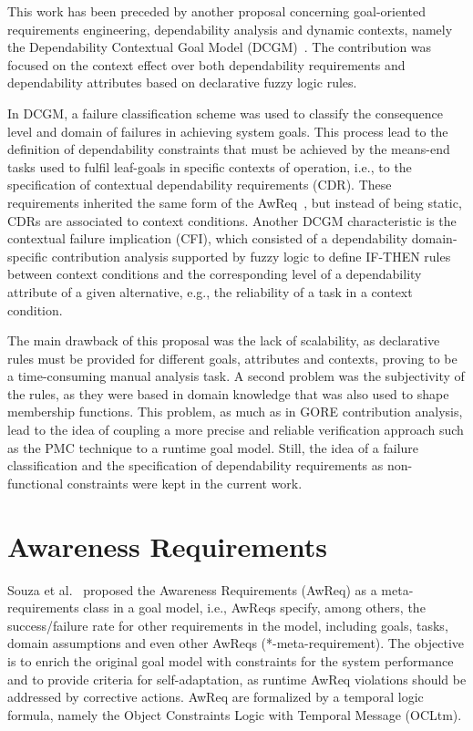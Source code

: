 This work has been preceded by another proposal concerning goal-oriented requirements engineering, dependability analysis and dynamic contexts, namely the Dependability Contextual Goal Model (DCGM)~\cite{Mendonca:2014}. The contribution was focused on the context effect over both dependability requirements and dependability attributes based on declarative fuzzy logic rules. 

In DCGM, a failure classification scheme was used to classify the consequence level and domain of failures in achieving system goals. This process lead to the definition of dependability constraints that must be achieved by the means-end tasks used to fulfil leaf-goals in specific contexts of operation, i.e., to the specification of contextual dependability requirements (CDR). These requirements inherited the same form of the AwReq~\cite{Souza:2011}, but instead of being static, CDRs are associated to context conditions. Another DCGM characteristic is the contextual failure implication (CFI), which consisted of a dependability domain-specific contribution analysis supported by fuzzy logic to define IF-THEN rules between context conditions and the corresponding level of a dependability attribute of a given alternative, e.g., the reliability of a task in a context condition.

The main drawback of this proposal was the lack of scalability, as declarative rules must be provided for different goals, attributes and contexts, proving to be a time-consuming manual analysis task. A second problem was the subjectivity of the rules, as they were based in domain knowledge that was also used to shape membership functions. This problem, as much as in GORE contribution analysis, lead to the idea of coupling a more precise and reliable verification approach such as the PMC technique to a runtime goal model. Still, the idea of a failure classification and the specification of dependability requirements as non-functional constraints were kept in the current work.

\section{Awareness Requirements}

Souza et al.~\cite{Souza:2011} proposed the Awareness Requirements (AwReq) as a meta-requirements class in a goal model, i.e., AwReqs specify, among others, the success/failure rate for other requirements in the model, including goals, tasks, domain assumptions and even other AwReqs (*-meta-requirement). The objective is to enrich the original goal model with constraints for the system performance and to provide criteria for self-adaptation, as runtime AwReq violations should be addressed by corrective actions. AwReq are formalized by a temporal logic formula, namely the Object Constraints Logic with Temporal Message (OCLtm).

